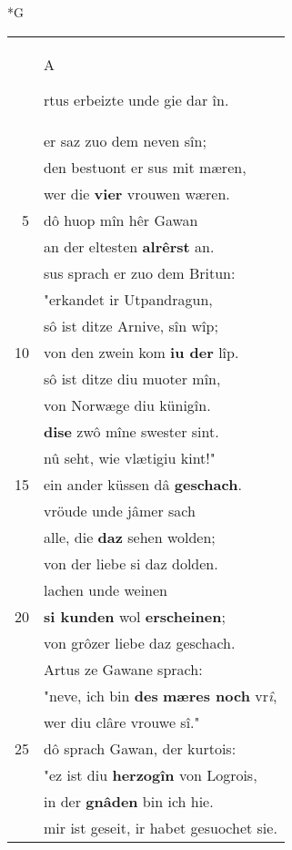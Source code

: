 \documentclass[8pt,a4paper,notitlepage]{article}
\begin{document}
\newpage
\begin{table}[ht]
\begin{minipage}[t]{0.5\linewidth}
\small
\begin{center}*G
\end{center}
\begin{tabular}{rl}
 & \begin{large}A\end{large}rtus erbeizte unde gie dar în.\\ 
 & er saz zuo dem neven sîn;\\ 
 & den bestuont er sus mit mæren,\\ 
 & wer die \textbf{vier} vrouwen wæren.\\ 
5 & dô huop mîn hêr Gawan\\ 
 & an der eltesten \textbf{alrêrst} an.\\ 
 & sus sprach er zuo dem Britun:\\ 
 & "erkandet ir Utpandragun,\\ 
 & sô ist ditze Arnive, sîn wîp;\\ 
10 & von den zwein kom \textbf{iu der} lîp.\\ 
 & sô ist ditze diu muoter mîn,\\ 
 & von Norwæge diu künigîn.\\ 
 & \textbf{dise} zwô mîne swester sint.\\ 
 & nû seht, wie vlætigiu kint!"\\ 
15 & ein ander küssen dâ \textbf{geschach}.\\ 
 & vröude unde jâmer sach\\ 
 & alle, die \textbf{daz} sehen wolden;\\ 
 & von der liebe si daz dolden.\\ 
 & lachen unde weinen\\ 
20 & \textbf{si kunden} wol \textbf{erscheinen};\\ 
 & von grôzer liebe daz geschach.\\ 
 & Artus ze Gawane sprach:\\ 
 & "neve, ich bin \textbf{des} \textbf{mæres noch} vr\textit{î},\\ 
 & wer diu clâre vrouwe sî."\\ 
25 & dô sprach Gawan, der kurtois:\\ 
 & "ez ist diu \textbf{herzogîn} von Logrois,\\ 
 & in der \textbf{gnâden} bin ich hie.\\ 
 & mir ist geseit, ir habet gesuochet sie.\\ 

\end{tabular}
\end{minipage}
\end{table}
\end{document}
